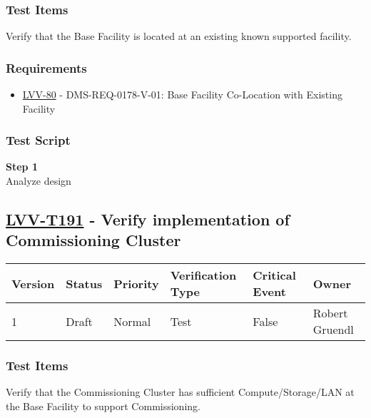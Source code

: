 \subsubsection{Test Items}\label{test-items-49}

Verify that the Base Facility is located at an existing known supported
facility.

\subsubsection{Requirements}\label{requirements-49}

\begin{itemize}
\tightlist
\item
  \href{https://jira.lsstcorp.org/browse/LVV-80}{LVV-80} -
  DMS-REQ-0178-V-01: Base Facility Co-Location with Existing Facility
\end{itemize}

\subsubsection{Test Script}\label{test-script-49}

\textbf{Step 1}\\
Analyze design\\[2\baselineskip]

\hypertarget{lvv-t191---verify-implementation-of-commissioning-cluster}{\subsection{\texorpdfstring{\href{https://jira.lsstcorp.org/secure/Tests.jspa\#/testCase/LVV-T191}{LVV-T191}
- Verify implementation of Commissioning
Cluster}{LVV-T191 - Verify implementation of Commissioning Cluster}}\label{lvv-t191---verify-implementation-of-commissioning-cluster}}

\begin{longtable}[]{@{}llllll@{}}
\toprule
Version & Status & Priority & Verification Type & Critical Event &
Owner\tabularnewline
\midrule
\endhead
1 & Draft & Normal & Test & False & Robert Gruendl\tabularnewline
\bottomrule
\end{longtable}

\subsubsection{Test Items}\label{test-items-50}

Verify that the Commissioning Cluster has sufficient Compute/Storage/LAN
at the Base Facility to support Commissioning.

